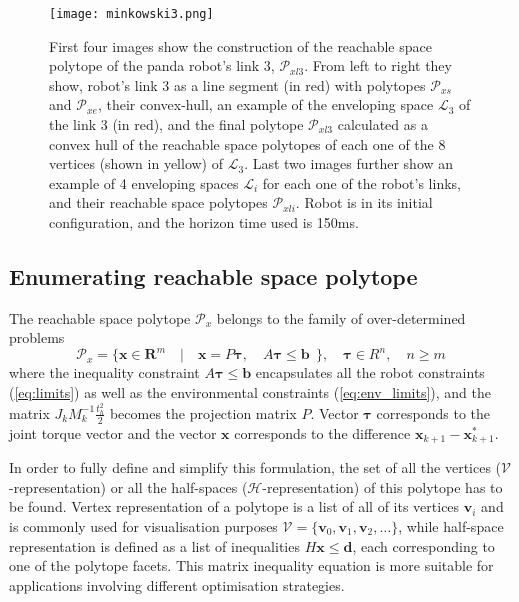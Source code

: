 \begin{figure}[!t]
    \centering
    \texttt{[image: minkowski3.png]}
    \caption{ First four images show the construction of the reachable space polytope of the panda robot's link 3, $\mathcal{P}_{xl3}$. From left to right they show, robot's link 3 as a line segment (in red) with polytopes $\mathcal{P}_{xs}$ and $\mathcal{P}_{xe}$, their convex-hull, an example of the enveloping space $\mathcal{L}_3$ of the link 3 (in red), and the final polytope $\mathcal{P}_{xl3}$ calculated as a convex hull of the reachable space polytopes of each one of the 8 vertices (shown in yellow) of $\mathcal{L}_3$.
    Last two images further show an example of 4 enveloping spaces $\mathcal{L}_i$ for each one of the robot's links, and their reachable space polytopes $\mathcal{P}_{xli}$. Robot is in its initial configuration, and the horizon time used is 150ms.}
    \label{fig:minkowski}
\vspace{-0.3cm}
\end{figure}

\vspace{-0.2cm}
\subsection{Enumerating reachable space polytope}
\label{ch:enumerating}

The reachable space polytope $\mathcal{P}_x$ belongs to the family of over-determined problems
\begin{equation}
    \mathcal{P}_x = \{ \bm{x} \in \mathbf{R}^m \quad| \quad \bm{x}=P\bm{\tau},\quad  A\bm{\tau}\leq \bm{b} ~~\}, \quad \bm{\tau}\in R^n, \quad n\geq m
\label{eq:polytope_family}
\end{equation}
where the inequality constraint $A\bm{\tau}\leq \bm{b}$ encapsulates all the robot constraints (\ref{eq:limits}) as well as the environmental constraints (\ref{eq:env_limits}), and the matrix $J_k M_k^{-1}\frac{t_h^2}{2}$ becomes the projection matrix $P$. Vector $\bm{\tau}$ corresponds to the joint torque vector and the vector $\bm{x}$ corresponds to the difference $\bm{x}_{k+1}\!-\!\bm{x}_{k+1}^*$.

In order to fully define and simplify this formulation, the set of all the vertices ($\mathcal{V}$-representation) or all the half-spaces ($\mathcal{H}$-representation) of this polytope has to be found. Vertex representation of a polytope is a list of all of its vertices $\bm{v}_i$ and is commonly used for visualisation purposes
$
\mathcal{V}\!= \!\{ \bm{v}_0, \bm{v}_1, \bm{v}_2, \dots \}
$,
while half-space representation is defined as a list of inequalities $H\bm{x} \leq \bm{d}$, each corresponding to one of the polytope facets. This matrix inequality equation is more suitable for applications involving different optimisation strategies.

